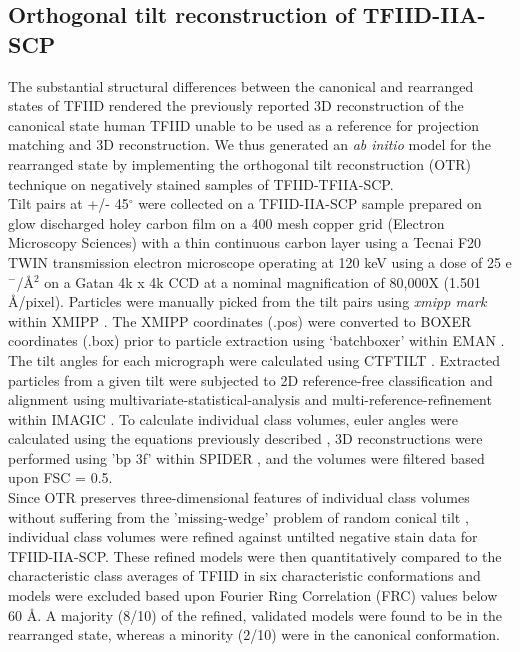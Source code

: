 \subsection{Orthogonal tilt reconstruction of TFIID-IIA-SCP} 
The substantial structural differences between the canonical and rearranged states of TFIID rendered the previously reported 3D reconstruction of the canonical state human TFIID unable to be used as a reference for projection matching and 3D reconstruction.  We thus generated an \emph{ab initio} model for the rearranged state by implementing the orthogonal tilt reconstruction (OTR) technique \cite{Leschziner_1228} on negatively stained samples of TFIID-TFIIA-SCP. \\
\indent Tilt pairs at +/- 45$^{\circ}$ were collected on a TFIID-IIA-SCP sample prepared on glow discharged holey carbon film \cite{Bradley_4010} on a 400 mesh copper grid (Electron Microscopy Sciences) with a thin continuous carbon layer using a Tecnai F20 TWIN transmission electron microscope operating at 120 keV using a dose of 25 e$^{-}$/\AA$^{2}$ on a Gatan 4k x 4k CCD at a nominal magnification of 80,000X (1.501 \AA/pixel).  Particles were manually picked from the tilt pairs using \emph{xmipp mark} within XMIPP \cite{Sorzano_1492}.  The XMIPP coordinates (.pos) were converted to BOXER coordinates (.box) prior to particle extraction using ‘batchboxer’ within EMAN \cite{Ludtke_2307}.  The tilt angles for each micrograph were calculated using CTFTILT \cite{Mindell_1684}.  Extracted particles from a given tilt were subjected to 2D reference-free classification and alignment using multivariate-statistical-analysis and multi-reference-refinement within IMAGIC \cite{va_2849}.  To calculate individual class volumes, euler angles were calculated using the equations previously described \cite{Leschziner_452}, 3D reconstructions were performed using 'bp 3f' within SPIDER \cite{Frank_2988}, and the volumes were filtered based upon FSC = 0.5.\\   
\indent Since OTR preserves three-dimensional features of individual class volumes without suffering from the 'missing-wedge' problem of random conical tilt \cite{Chandramouli_280}, individual class volumes were refined against untilted negative stain data for TFIID-IIA-SCP.  These refined models were then quantitatively compared to the characteristic class averages of TFIID in six characteristic conformations and models were excluded based upon Fourier Ring Correlation (FRC) \cite{Saxton_3960} values below 60 \AA.  A majority (8/10) of the refined, validated models were found to be in the rearranged state, whereas a minority (2/10) were in the canonical conformation.\\ 

